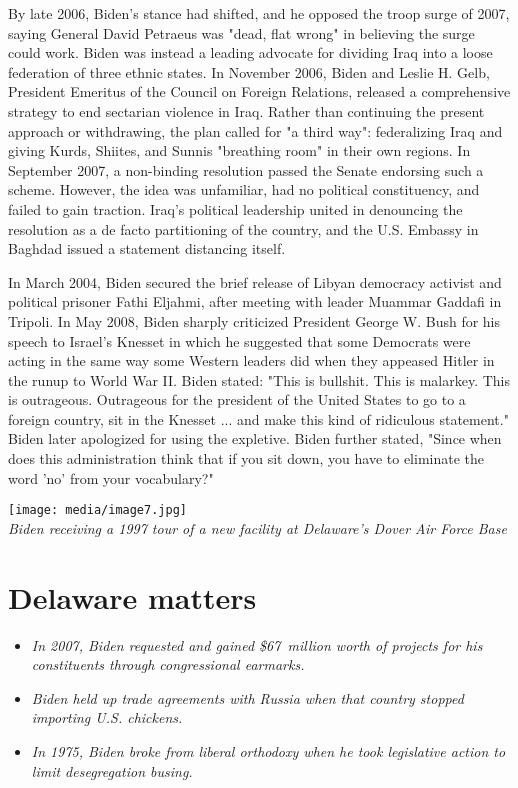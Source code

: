 By late 2006, Biden's stance had shifted, and he opposed the troop surge
of 2007, saying General David Petraeus was "dead, flat wrong" in
believing the surge could work. Biden was instead a leading advocate for
dividing Iraq into a loose federation of three ethnic states. In
November 2006, Biden and Leslie H. Gelb, President Emeritus of the
Council on Foreign Relations, released a comprehensive strategy to end
sectarian violence in Iraq. Rather than continuing the present approach
or withdrawing, the plan called for "a third way": federalizing Iraq and
giving Kurds, Shiites, and Sunnis "breathing room" in their own regions.
In September 2007, a non-binding resolution passed the Senate endorsing
such a scheme. However, the idea was unfamiliar, had no political
constituency, and failed to gain traction. Iraq's political leadership
united in denouncing the resolution as a de facto partitioning of the
country, and the U.S. Embassy in Baghdad issued a statement distancing
itself.

In March 2004, Biden secured the brief release of Libyan democracy
activist and political prisoner Fathi Eljahmi, after meeting with leader
Muammar Gaddafi in Tripoli. In May 2008, Biden sharply criticized
President George W. Bush for his speech to Israel's Knesset in which he
suggested that some Democrats were acting in the same way some Western
leaders did when they appeased Hitler in the runup to World War II.
Biden stated: "This is bullshit. This is malarkey. This is outrageous.
Outrageous for the president of the United States to go to a foreign
country, sit in the Knesset ... and make this kind of ridiculous
statement." Biden later apologized for using the expletive. Biden
further stated, "Since when does this administration think that if you
sit down, you have to eliminate the word 'no' from your vocabulary?"

\texttt{[image: media/image7.jpg]}\\
\emph{Biden receiving a 1997 tour of a new facility at Delaware's Dover
Air Force Base}

\section{Delaware matters}\label{delaware-matters}

\begin{itemize}
\item
  \emph{In 2007, Biden requested and gained \$67~million worth of
  projects for his constituents through congressional earmarks.}
\item
  \emph{Biden held up trade agreements with Russia when that country
  stopped importing U.S. chickens.}
\item
  \emph{In 1975, Biden broke from liberal orthodoxy when he took
  legislative action to limit desegregation busing.}
\end{itemize}

